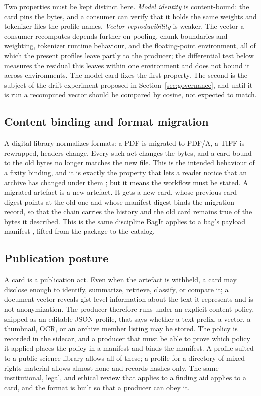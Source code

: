 \documentclass[11pt]{article}
\begin{document}
Two properties must be kept distinct here. \emph{Model identity} is
content-bound: the card pins the bytes, and a consumer can verify that it
holds the same weights and tokenizer files the profile names. \emph{Vector
reproducibility} is weaker. The vector a consumer recomputes depends further
on pooling, chunk boundaries and weighting, tokenizer runtime behaviour, and
the floating-point environment, all of which the present profiles leave
partly to the producer; the differential test below measures the residual
this leaves within one environment and does not bound it across
environments. The model card fixes the first property. The second is the
subject of the drift experiment proposed in Section~\ref{sec:governance}, and
until it is run a recomputed vector should be compared by cosine, not
expected to match.

\subsection{Content binding and format migration}

A digital library normalizes formats: a PDF is migrated to PDF/A, a TIFF is
rewrapped, headers change. Every such act changes the bytes, and a card bound
to the old bytes no longer matches the new file. This is the intended
behaviour of a fixity binding, and it is exactly the property that lets a
reader notice that an archive has changed under them \citep{Lerner:2017,
Aturban:2019}; but it means the workflow must be stated. A migrated artefact
is a new artefact. It gets a new card, whose previous-card digest points at the
old one and whose manifest digest binds the migration record, so that the
chain carries the history and the old card remains true of the bytes it
described. This is the same discipline BagIt applies to a bag's payload
manifest \citep{Kunze:2018}, lifted from the package to the catalog.

\subsection{Publication posture}

A card is a publication act. Even when the artefact is withheld, a card may
disclose enough to identify, summarize, retrieve, classify, or compare it; a
document vector reveals gist-level information about the text it represents
and is not anonymization. The producer therefore runs under an explicit
content policy, shipped as an editable JSON profile, that says whether a text
prefix, a vector, a thumbnail, OCR, or an archive member listing may be
stored. The policy is recorded in the sidecar, and a producer that must be
able to prove which policy it applied places the policy in a manifest and
binds the manifest. A profile suited to a public science library allows all
of these; a profile for a directory of mixed-rights material allows almost
none and records hashes only. The same institutional, legal, and ethical
review that applies to a finding aid applies to a card, and the format is
built so that a producer can obey it.
\end{document}
